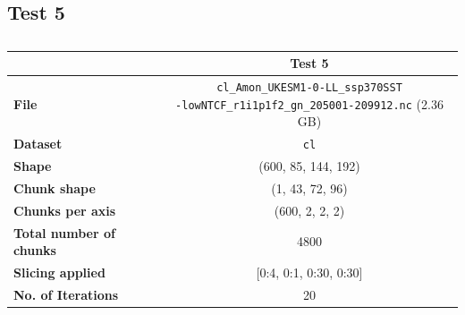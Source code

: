 \documentclass{article}
\begin{document}
\break
\subsection{Test 5}
\begin{table}[h!] 
    \centering 
    \begin{tabular}{lc}  \hline
                                        & Test 5                                                                                                        \\ \hline
        \textbf{File}                   &  \makecell{\texttt{cl\_Amon\_UKESM1-0-LL\_ssp370SST}\\ \texttt{-lowNTCF\_r1i1p1f2\_gn\_205001-209912.nc} (2.36 GB)}     \\  
        \textbf{Dataset}                &\texttt{cl}                                                                                \\ 
        \textbf{Shape}                  &  (600, 85, 144, 192)                                                                                              \\ 
        \textbf{Chunk shape}            & (1, 43, 72, 96)                                                                                                 \\ 
        \textbf{Chunks per axis}        & (600, 2, 2, 2)                                                                                                  \\ 
        \textbf{Total number of chunks} & 4800                                                                                                          \\ 
        \textbf{Slicing applied}        & [0:4, 0:1, 0:30, 0:30]                                                                                             \\ 
        \textbf{No. of Iterations}      & 20                                                                                                            \\  \hline
    \end{tabular} 
    \caption{} 
    \label{tab:T5_Conditions} 
\end{table}
\end{document}
